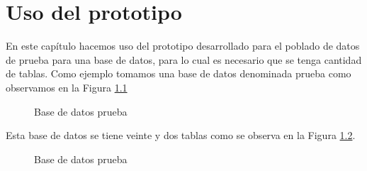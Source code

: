 \chapter{Uso del prototipo}
En este cap\'itulo hacemos uso del prototipo desarrollado para el poblado de datos de prueba para una base de datos, para lo cual es necesario que se tenga cantidad de tablas.
Como ejemplo tomamos  una base de datos denominada prueba como observamos en la Figura \ref{fig:createDatabase}

\begin{figure}[H]
\caption{Base de datos prueba} \label{fig:createDatabase}
\centering
{}
\end{figure}

Esta base de datos se tiene veinte y dos tablas como se observa en la Figura \ref{fig:listatablePrueba}. 
\begin{figure}[H]
\caption{Base de datos prueba} \label{fig:listatablePrueba}
\centering
{}
\end{figure}

